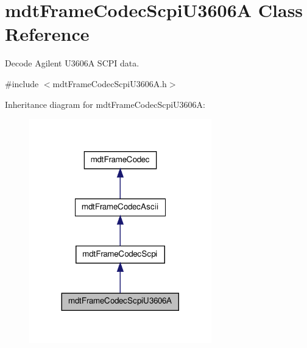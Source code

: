 \hypertarget{classmdt_frame_codec_scpi_u3606_a}{\section{mdt\-Frame\-Codec\-Scpi\-U3606\-A Class Reference}
\label{classmdt_frame_codec_scpi_u3606_a}
}


Decode Agilent U3606\-A S\-C\-P\-I data.  




{\ttfamily \#include $<$mdt\-Frame\-Codec\-Scpi\-U3606\-A.\-h$>$}



Inheritance diagram for mdt\-Frame\-Codec\-Scpi\-U3606\-A\-:
\nopagebreak
\begin{figure}[H]
\begin{center}
\leavevmode
\includegraphics[width=224pt]{classmdt_frame_codec_scpi_u3606_a__inherit__graph}
\end{center}
\end{figure}


